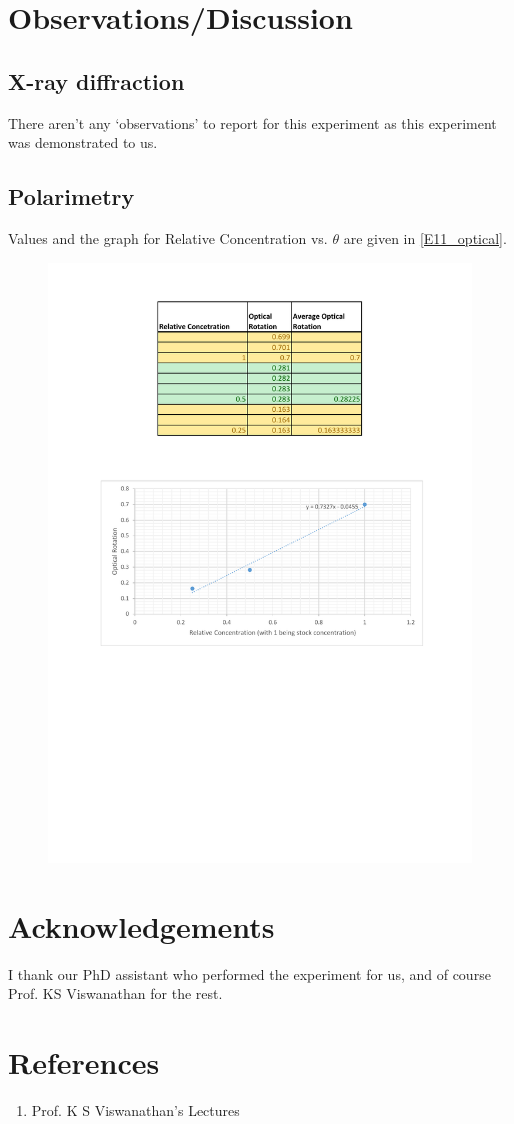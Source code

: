 \section{Observations/Discussion}
	\subsection{X-ray diffraction}
		There aren't any `observations' to report for this experiment as this experiment was demonstrated to us.
	\subsection{Polarimetry}
		Values and the graph for Relative Concentration vs. $\theta$ are given in \autoref{E11_optical}.

		\begin{figure}[bth]
			\begin{center}
				\includegraphics[width=1.15\linewidth]{gfx/11_optical}
			\end{center}
		\caption[Optical Rotation]{\label{E11_optical}}
		\end{figure}

\section{Acknowledgements}
I thank our PhD assistant who performed the experiment for us, and of course Prof. KS Viswanathan for the rest.

\section{References}
	\begin{enumerate}
		\item Prof. K S Viswanathan's Lectures
	\end{enumerate}